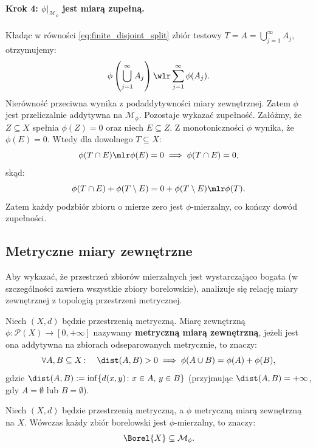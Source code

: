 \begin{dow}
    \paragraph{Krok 4: $\phi|_{\mathcal{M}_\phi}$ jest miarą zupełną.}
    Kładąc w równości \eqref{eq:finite_disjoint_split} zbiór testowy $T = A = \bigcup_{j=1}^\infty A_j$, otrzymujemy:
    \begin{equation*}
        \phi\left(\bigcup_{j=1}^\infty A_j\right) \wlr \sum_{j=1}^\infty \phi(A_j).
    \end{equation*}
    Nierówność przeciwna wynika z podaddytywności miary zewnętrznej. Zatem $\phi$ jest przeliczalnie addytywna na $\mathcal{M}_\phi$. Pozostaje wykazać zupełność. Załóżmy, że $Z \subseteq X$ spełnia $\phi(Z) = 0$ oraz niech $E \subseteq Z$. Z monotoniczności $\phi$ wynika, że $\phi(E) = 0$. Wtedy dla dowolnego $T \subseteq X$:
    \begin{equation*}
        \phi(T \cap E) \mlr \phi(E) = 0 \implies \phi(T \cap E) = 0,
    \end{equation*} skąd:
    \begin{equation*}
        \phi(T \cap E) + \phi(T \setminus E) = 0 + \phi(T \setminus E) \mlr \phi(T).
    \end{equation*}
    Zatem każdy podzbiór zbioru o mierze zero jest $\phi$-mierzalny, co kończy dowód zupełności.
\end{dow}
\subsection{Metryczne miary zewnętrzne}
Aby wykazać, że przestrzeń zbiorów mierzalnych jest wystarczająco bogata (w szczególności zawiera wszystkie zbiory borelowskie), analizuje się relację miary zewnętrznej z topologią przestrzeni metrycznej.
\begin{defi}
    Niech $(X, d)$ będzie przestrzenią metryczną. Miarę zewnętrzną $\phi \colon \mathcal{P}(X) \to [0, +\infty]$ nazywamy \textbf{metryczną miarą zewnętrzną}, jeżeli jest ona addytywna na zbiorach odseparowanych metrycznie, to znaczy:
    \begin{equation*}
        \forall A, B \subseteq X \colon \quad \dist(A, B) > 0 \implies \phi(A \cup B) = \phi(A) + \phi(B),
    \end{equation*}
    gdzie $\dist(A, B) := \inf\{d(x, y) \colon x \in A, \, y \in B\}$ (przyjmując $\dist(A, B) = +\infty$, gdy $A = \emptyset$ lub $B = \emptyset$).
\end{defi}
\begin{tw}\label{tw:metric_borel}
    Niech $(X, d)$ będzie przestrzenią metryczną, a $\phi$ metryczną miarą zewnętrzną na $X$. Wówczas każdy zbiór borelowski jest $\phi$-mierzalny, to znaczy:
    \begin{equation*}
        \Borel{X} \subseteq \mathcal{M}_\phi.
    \end{equation*}
\end{tw}

